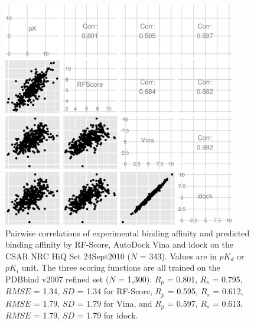 \begin{figure}[!ht]
\begin{center}
\includegraphics[width=4in]{../istar/CSAR2010Correlations.eps}
\end{center}
\caption{Pairwise correlations of experimental binding affinity and predicted binding affinity by RF-Score, AutoDock Vina and idock on the CSAR NRC HiQ Set 24Sept2010 ($N$ = 343). Values are in $pK_d$ or $pK_i$ unit. The three scoring functions are all trained on the PDBbind v2007 refined set ($N$ = 1,300). $R_p$ = 0.801, $R_s$ = 0.795, $RMSE$ = 1.34, $SD$ = 1.34 for RF-Score, $R_p$ = 0.595, $R_s$ = 0.612, $RMSE$ = 1.79, $SD$ = 1.79 for Vina, and $R_p$ = 0.597, $R_s$ = 0.613, $RMSE$ = 1.79, $SD$ = 1.79 for idock.}
\label{CSAR2010Correlations}
\end{figure}

